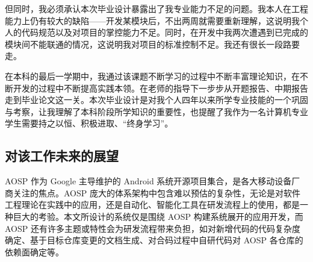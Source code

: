 但同时，我必须承认本次毕业设计暴露出了我专业能力不足的问题。我本人在工程能力上仍有较大的缺陷——开发某模块后，不出两周就需要重新理解，这说明我个人的代码规范以及对项目的掌控能力不足。同时，在开发中我两次遭遇到已完成的模块间不能联通的情况，这说明我对项目的标准控制不足。我还有很长一段路要走。

在本科的最后一学期中，我通过该课题不断学习的过程中不断丰富理论知识，在不断开发的过程中不断提高实践本领。在老师的指导下一步步从开题报告、中期报告走到毕业论文这一关。本次毕业设计是对我个人四年以来所学专业技能的一个巩固与考察，让我理解了本科阶段所学知识的重要性，也提醒了我作为一名计算机专业学生需要持之以恒、积极进取、“终身学习”。

\subsection{对该工作未来的展望}

AOSP 作为 Google 主导维护的 Android 系统开源项目集合，是各大移动设备厂商关注的焦点。AOSP 庞大的体系架构中包含难以预估的复杂性，无论是对软件工程理论在实践中的应用，还是自动化、智能化工具在研发流程上的使用，都是一种巨大的考验。本文所设计的系统仅是围绕 AOSP 构建系统展开的应用开发，而 AOSP 还有许多主题或特性会为研发流程带来负担，如对新增代码的代码复杂度确定、基于目标仓库变更的文档生成、对合码过程中自研代码对 AOSP 各仓库的依赖面确定等。